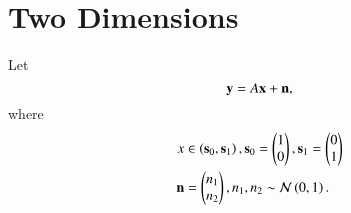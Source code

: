 \documentclass[journal,12pt,twocolumn]{IEEEtran}
\begin{document}
\section{Two Dimensions}
Let 
\begin{equation}
\mathbf{y} = A\mathbf{x} + \mathbf{n},
\end{equation}
where 
\begin{align}
x &\in \left(\mathbf{s}_0,\mathbf{s}_1\right), 
\mathbf{s}_0 = 
\begin{pmatrix}
1 
\\
0
\end{pmatrix},
\mathbf{s}_1 = 
\begin{pmatrix}
0 
\\
1
\end{pmatrix}
\\
\mathbf{n} &= 
\begin{pmatrix}
n_1
\\
n_2
\end{pmatrix},
n_1,n_2 \sim \mathcal{N}\left(0,1\right).
\end{align}
%
\end{document}
